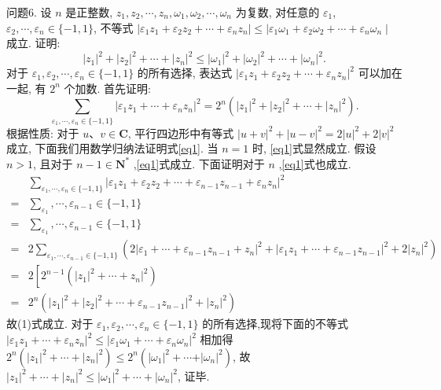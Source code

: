 问题6. 设 $n$ 是正整数, $z_1, z_2, \cdots, z_n, \omega_1, \omega_2, \cdots, \omega_n$ 为复数, 对任意的 $\varepsilon_1$, $\varepsilon_2, \cdots, \varepsilon_n \in\{-1,1\}$, 不等式 $\left|\varepsilon_1 z_1+\varepsilon_2 z_2+\cdots+\varepsilon_n z_n\right| \leqslant \mid \varepsilon_1 \omega_1+ \varepsilon_2 \omega_2+\cdots+\varepsilon_n \omega_n \mid$ 成立.
证明:
$$
\left|z_1\right|^2+\left|z_2\right|^2+\cdots+\left|z_n\right|^2 \leqslant\left|\omega_1\right|^2+\left|\omega_2\right|^2+\cdots+\left|\omega_n\right|^2 . \label{eq1}
$$
对于 $\varepsilon_1, \varepsilon_2, \cdots, \varepsilon_n \in\{-1,1\}$ 的所有选择, 表达式 $\mid \varepsilon_1 z_1+\varepsilon_2 z_2+\cdots+ \left.\varepsilon_n z_n\right|^2$ 可以加在一起, 有 $2^n$ 个加数.
首先证明:
$$
\sum_{\varepsilon_1, \cdots, \varepsilon_n \in\{-1,1\}}\left|\varepsilon_1 z_1+\cdots+\varepsilon_n z_n\right|^2=2^n\left(\left|z_1\right|^2+\left|z_2\right|^2+\cdots+\left|z_n\right|^2\right) .
$$
根据性质: 对于 $u 、 v \in \mathbf{C}$, 平行四边形中有等式 $|u+v|^2+|u-v|^2= 2|u|^2+2|v|^2$ 成立, 下面我们用数学归纳法证明式\ref{eq1}.
当 $n=1$ 时, \ref{eq1}式显然成立.
假设 $n>1$, 且对于 $n-1 \in \mathbf{N}^*$ ,\ref{eq1}式成立.
下面证明对于 $n$ ,\ref{eq1}式也成立.
$$
\begin{aligned}
& \sum_{\varepsilon_1, \cdots, \varepsilon_n \in\{-1,1\}}\left|\varepsilon_1 z_1+\varepsilon_2 z_2+\cdots+\varepsilon_{n-1} z_{n-1}+\varepsilon_n z_n\right|^2 \\
= & \sum_{\varepsilon_1}, \cdots, \varepsilon_{n-1} \in\{-1,1\} \\
= & \sum_{\varepsilon_1}, \cdots, \varepsilon_{n-1} \in\{-1,1\} \\
= & 2 \sum_{\varepsilon_1, \cdots, \varepsilon_{n-1} \in\{-1,1\}}\left(2\left|\varepsilon_1+\cdots+\varepsilon_{n-1} z_{n-1}+z_n\right|^2+\left|\varepsilon_1 z_1+\cdots+\varepsilon_{n-1} z_{n-1}\right|^2+2\left|z_n\right|^2\right) \\
= & 2\left[2^{n-1}\left(\left|z_1\right|^2+\cdots+\left.z_n\right|^2\right)\right. \\
= & 2^n\left(\left|z_1\right|^2+\left|z_2\right|^2+\cdots+\left.\varepsilon_{n-1} z_{n-1}\right|^2+\left|z_n\right|^2\right)
\end{aligned}
$$
故(1)式成立.
对于 $\varepsilon_1, \varepsilon_2, \cdots, \varepsilon_n \in\{-1,1\}$ 的所有选择,现将下面的不等式 $\mid \varepsilon_1 z_1+\cdots+ \left.\varepsilon_n z_n\right|^2 \leqslant\left|\varepsilon_1 \omega_1+\cdots+\varepsilon_n \omega_n\right|^2$ 相加得 $2^n\left(\left|z_1\right|^2+\cdots+\left|z_n\right|^2\right) \leqslant 2^n\left(\left|\omega_1\right|^2+\cdots\right. \left.+\left|\omega_n\right|^2\right)$, 故 $\left|z_1\right|^2+\cdots+\left|z_n\right|^2 \leqslant\left|\omega_1\right|^2+\cdots+\left|\omega_n\right|^2$, 证毕.



